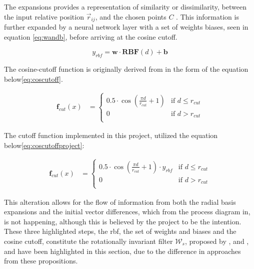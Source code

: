 The expansions provides a representation of similarity or dissimilarity, between the input relative position $\vec{r}_{ij}$,
and the chosen points $C$ \cite{rbf}. This information is further expanded by a neural network layer with a set of weights
biases, seen in equation \ref{eq:wandb}, before arriving at the cosine cutoff.

\begin{equation}\label{eq:wandb}
    y_{rbf} = \mathbf{w} \cdot \mathbf{RBF}(d) + \mathbf{b}
\end{equation}

The cosine-cutoff function is originally derived from \cite{Behler2011}
in the form of the equation below\ref{eq:coscutoff}.

\begin{equation}\label{eq:coscutoff}
    \begin{aligned}
        \mathbf{f}_{cut}(x) & =
        \begin{cases}
            0.5 \cdot \cos \left( \frac{\pi d}{r_{cut}} + 1  \right) & \text{if } d \leq r_{cut} \\
            0                                                        & \text{if } d > r_{cut}    \\
        \end{cases}
    \end{aligned}
\end{equation}

The cutoff function implemented in this project, utilized the equation below\ref{eq:coscutoffproject}:

\begin{equation}\label{eq:coscutoffproject}
    \begin{aligned}
        \mathbf{f}_{cut}(x) & =
        \begin{cases}
            0.5 \cdot \cos \left( \frac{\pi d}{r_{cut}} + 1  \right) \cdot y_{rbf} & \text{if } d \leq r_{cut} \\
            0                                                                      & \text{if } d > r_{cut}    \\
        \end{cases}
    \end{aligned}
\end{equation}

This alteration allows for the flow of information from both the radial basis expansions and the initial vector differences,
which from the process diagram in\cite{PAINN}, is not happening, although this is believed by the project to be the intention.
These three highlighted steps, the rbf, the set of weights and biases and the cosine cutoff,
constitute the rotationally invariant filter $\mathcal{W}_{s}$, proposed by \cite{Gasteiger2020},
and \cite{Behler2011}, and have been highlighted in this section, due to the difference in approaches from these propositions.

